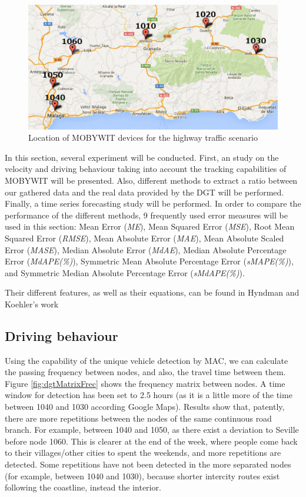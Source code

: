 \documentclass[preprint]{elsarticle}
\begin{document}
\begin{figure}[htb]
	\begin{center}
		\includegraphics[scale=0.4]{imgs/nodos_dgt.eps}
		\caption{Location of MOBYWIT devices for the highway traffic scenario}
	\label{fig:nodosDGT}
	\end{center}
\end{figure}

In this section, several experiment will be conducted. First, an study on the velocity and driving behaviour taking into account the tracking capabilities of MOBYWIT will be presented. Also, different methods to extract a ratio between our gathered data and the real data provided by the DGT will be performed. Finally, a time series forecasting study will be performed. In order to compare the performance of the different methods, 9 frequently used error measures will be used in this section:
Mean Error ({\em ME}),
 Mean Squared Error ({\em MSE}),
 Root Mean Squared Error ({\em RMSE}),
 Mean Absolute Error ({\em MAE}),
 Mean Absolute Scaled Error ({\em MASE}),
 Median Absolute Error ({\em MdAE}),
 Median Absolute Percentage Error ({\em MdAPE(\%)}),
 Symmetric Mean Absolute Percentage Error ({\em sMAPE(\%)}), and
 Symmetric Median Absolute Percentage Error ({\em sMdAPE(\%)}).

Their different features, as well as their equations, can be found in Hyndman and Koehler's work ~\cite{RePEc:eee:intfor:v:22:y:2006:i:4:p:679-688}




\subsection{Driving behaviour}

Using the capability of the unique vehicle detection by MAC, we can calculate the passing frequency between nodes, and also, the travel time between them. Figure \ref{fig:dgtMatrixFrec} shows the frequency matrix between nodes. A time window for detection has been set to 2.5 hours (as it is a little more of the time between 1040 and 1030 according Google Maps). Results show that, patently, there are more repetitions between the nodes of the same continuous road branch. For example, between 1040 and 1050, as there exist a deviation to Seville before node 1060. This is clearer at the end of the week, where people come back to their villages/other cities to spent the weekends, and more repetitions are detected. Some repetitions have not been detected in the more separated nodes (for example, between 1040 and 1030), because shorter intercity routes exist following the coastline, instead the interior.
\end{document}

